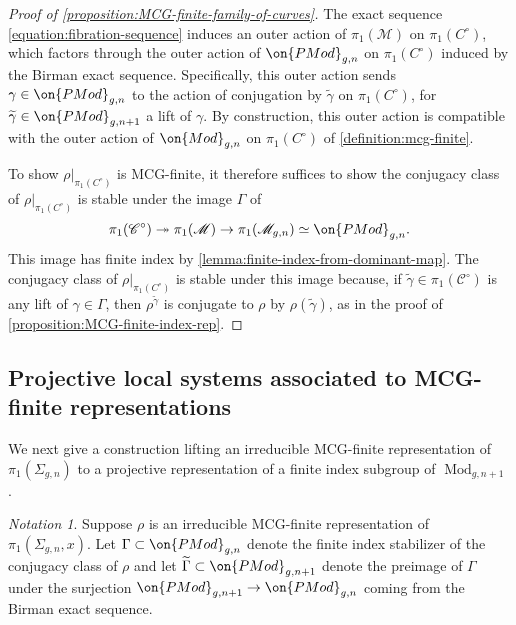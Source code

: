 \documentclass[12 pt]{amsart}
\theoremstyle{plain}
\theoremstyle{definition}
\theoremstyle{remark}
\newtheorem{notation}[subsubsection]{Notation}
\numberwithin{equation}{section}
\DeclareMathOperator\Mod{Mod}
\begin{document}
\subsubsection{}
\label{subsubsection:proof-family-of-curves}
\begin{proof}[Proof of {\autoref{proposition:MCG-finite-family-of-curves}}]
	The exact sequence \eqref{equation:fibration-sequence}
induces an outer action of $\pi_1(\mathscr M)$ on
$\pi_1(C^\circ)$, which factors through the outer action of $\on{PMod}_{g,n}$ on
$\pi_1(C^\circ)$ induced by the Birman exact sequence.
Specifically, this outer action sends $\gamma \in \on{PMod}_{g,n}$
to the action of conjugation by $\widetilde{\gamma}$ on $\pi_1(C^\circ)$, for
$\widetilde{\gamma}\in \on{PMod}_{g,n+1}$ 
a lift of $\gamma$.
By construction, this outer action is compatible with the outer action of $\on{Mod}_{g,n}$ on
$\pi_1(C^\circ)$ of \autoref{definition:mcg-finite}.

To show $\rho|_{\pi_1(C^\circ)}$ is MCG-finite,
it therefore suffices to show the conjugacy class of $\rho|_{\pi_1(C^\circ)}$ is stable under
the image $\Gamma$ of $$\pi_1(\mathscr{C}^\circ)\twoheadrightarrow \pi_1(\mathscr{M})\to \pi_1(\mathscr{M}_{g,n})\simeq \on{PMod}_{g,n}.$$
This image has finite index by \autoref{lemma:finite-index-from-dominant-map}. 
The conjugacy class of $\rho|_{\pi_1(C^\circ)}$ is stable under this image because, 
if $\widetilde{\gamma} \in \pi_1(\mathscr{C}^\circ)$ is any lift of  
$\gamma \in \Gamma$, then $\rho^{\widetilde{\gamma}}$ is conjugate to $\rho$ by $\rho(\widetilde{\gamma})$, as in the proof of \autoref{proposition:MCG-finite-index-rep}.
\end{proof}
\subsection{Projective local systems associated to MCG-finite representations}
\label{subsection:mcg-finite-construction}

We next give a construction lifting an irreducible MCG-finite representation
of $\pi_1(\Sigma_{g,n})$ to a projective representation of a finite index subgroup of $\Mod_{g,n+1}$.

\begin{notation}
	\label{notation:finite-orbit}
	Suppose $\rho$ is an irreducible MCG-finite representation of $\pi_1(\Sigma_{g,n},x)$.
	Let $\Gamma \subset \on{PMod}_{g,n}$ denote the finite index stabilizer
	of the conjugacy class of $\rho$ and let $\widetilde{\Gamma} \subset
	\on{PMod}_{g,n+1}$ denote the preimage of $\Gamma$ under the surjection
	$\on{PMod}_{g,n+1} \to \on{PMod}_{g,n}$ coming from the Birman exact
	sequence.
\end{notation}
	
\end{document}
